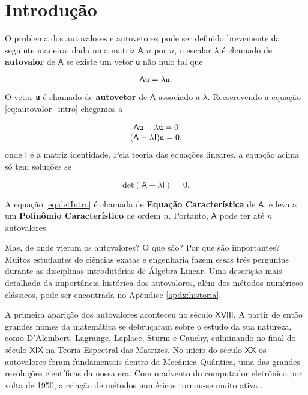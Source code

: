 \chapter{Introdução}
\label{cap:introducao}


	O problema dos autovalores e autovetores pode ser definido brevemente da seguinte maneira: dada uma matriz $\mathsf{A}$ $n$ por $n$, o escalar $\lambda$ é chamado de \textbf{autovalor} de $\mathsf{A}$ se existe um vetor \textbf{\texttt{u}} não nulo tal que

\begin{equation}\label{eq:autovalor_intro}
	\mathsf{A} \textbf{\texttt{u}} = \lambda \textbf{\texttt{u}}.
\end{equation}

O vetor \textbf{\texttt{u}} é chamado de \textbf{autovetor} de $\mathsf{A}$ associado a $\lambda$. Reescrevendo a equação \ref{eq:autovalor_intro} chegamos a 

\begin{equation}
		\begin{array}{c}
			\mathsf{A} \textbf{\texttt{u}} - \lambda \textbf{\texttt{u}} = 0 \\
			(\mathsf{A} - \lambda \mathsf{I})\textbf{\texttt{u}} = 0,
		\end{array}
\end{equation}
onde $\mathsf{I}$ é a matriz identidade. Pela teoria das equações lineares, a equação acima só tem soluções se

\begin{equation}\label{eq:detIntro}
	\mbox{det}(\mathsf{A} - \lambda \mathsf{I}) = 0.
\end{equation}

A equação \ref{eq:detIntro} é chamada de \textbf{Equação Característica} de $\mathsf{A}$, e leva a um \textbf{Polinômio Característico} de ordem $n$. Portanto, $\mathsf{A}$ pode ter até $n$ autovalores.

	Mas, de onde vieram os autovalores? O que são? Por que são importantes? Muitos estudantes de ciências exatas e engenharia fazem essas três perguntas durante as disciplinas introdutórias de Álgebra Linear. Uma descrição mais detalhada da importância histórica dos autovalores, além dos métodos numéricos clássicos, pode ser encontrada no Apêndice \ref{apdx:historia}.
	
	A primeira aparição dos autovalores aconteceu no século $\mathsf{XVIII}$. A partir de então grandes nomes da matemática se debruçaram sobre o estudo da sua natureza, como D'Alembert, Lagrange, Laplace, Sturm e Cauchy, culminando no final do século $\mathsf{XIX}$ na Teoria Espectral das Matrizes. No início do século $\mathsf{XX}$ os autovalores foram fundamentais dentro da Mecânica Quântica, uma das grandes revoluções científicas da nossa era. Com o advento do computador eletrônico por volta de 1950, a criação de métodos numéricos tornou-se muito ativa \cite{Hawkins75}.
	
